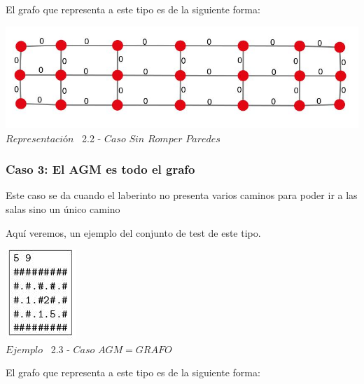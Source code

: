 El grafo que representa a este tipo es de la siguiente forma:\\

\vspace*{0.3cm} \vspace*{0.3cm}
  \begin{center}
 \includegraphics[scale=0.5]{./EJ2/ej2grafosinpared.jpeg}
 \\{$Representación$ \ 2.2 - $Caso$ $Sin$ $Romper$ $Paredes$}
  \end{center}
  \vspace*{0.3cm}


\begin{center}
\subsubsection*{Caso 3: El AGM es todo el grafo}
\end{center}

Este caso se da cuando el laberinto no presenta varios caminos para poder ir a las salas sino un \'unico camino 


Aqu\'i veremos, un ejemplo del conjunto de test de este tipo.\\
 
\vspace*{0.3cm} \vspace*{0.3cm}
  \begin{center}
 \includegraphics[scale=1.6]{./EJ2/ej2completo.jpeg}
\\ {$Ejemplo$ \ 2.3 - $Caso$ $AGM = GRAFO$}
  \end{center}
  \vspace*{0.3cm}

El grafo que representa a este tipo es de la siguiente forma:\\

